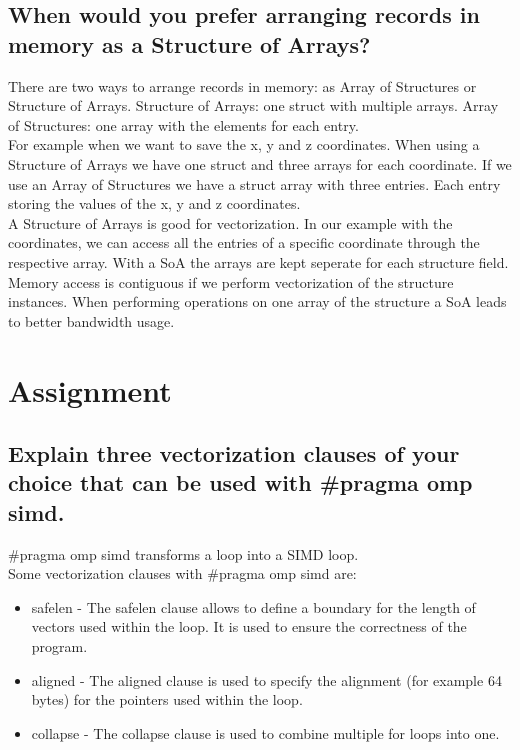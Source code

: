 \documentclass[runningheads]{llncs}
\begin{document}
\subsection{When would you prefer arranging records in memory as a Structure of Arrays?}
There are two ways to arrange records in memory: as Array of Structures or Structure of Arrays.
Structure of Arrays: one struct with multiple arrays.
Array of Structures: one array with the elements for each entry.
\\
For example when we want to save the x, y and z coordinates. When using a Structure of Arrays we have one struct and three arrays for each coordinate.
If we use an Array of Structures we have a struct array with three entries. 
Each entry storing the values of the x, y and z coordinates.
\\
A Structure of Arrays is good for vectorization. In our example with the coordinates, we can access all the entries of a specific coordinate
through the respective array.
With a SoA the arrays are kept seperate for each structure field. Memory access is contiguous if we perform vectorization of the structure instances.
When performing operations on one array of the structure a SoA leads to better bandwidth usage.


\section{Assignment}

\subsection{Explain three vectorization clauses of your choice that can be used with \#pragma omp simd.}
\#pragma omp simd transforms a loop into a SIMD loop.
\\
Some vectorization clauses with \#pragma omp simd are:
\begin{itemize}
	\item safelen - The safelen clause allows to define a boundary for the length of vectors used 
	within the loop. It is used to ensure the correctness of the program.
	\item aligned - The aligned clause is used to specify the alignment (for example 64 bytes) for 
	the pointers used within the loop.
	\item collapse - The collapse clause is used to combine multiple for loops into one.
\end{itemize}
\end{document}
